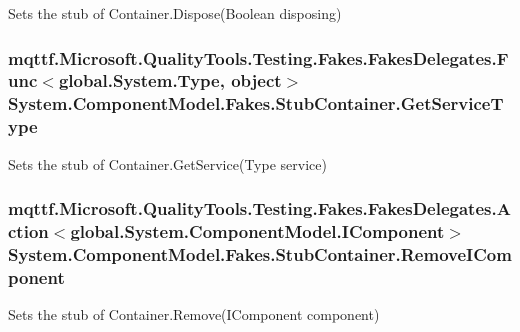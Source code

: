 Sets the stub of Container.\-Dispose(\-Boolean disposing)

\hypertarget{class_system_1_1_component_model_1_1_fakes_1_1_stub_container_a81580c55f5822c72b84cf20a802fa318}{
\subsubsection[{Get\-Service\-Type}]{\setlength{\rightskip}{0pt plus 5cm}mqttf.\-Microsoft.\-Quality\-Tools.\-Testing.\-Fakes.\-Fakes\-Delegates.\-Func$<$global.\-System.\-Type, object$>$ System.\-Component\-Model.\-Fakes.\-Stub\-Container.\-Get\-Service\-Type}}\label{class_system_1_1_component_model_1_1_fakes_1_1_stub_container_a81580c55f5822c72b84cf20a802fa318}


Sets the stub of Container.\-Get\-Service(\-Type service)

\hypertarget{class_system_1_1_component_model_1_1_fakes_1_1_stub_container_a0379ab10d6436a4136723460610443c2}{
\subsubsection[{Remove\-I\-Component}]{\setlength{\rightskip}{0pt plus 5cm}mqttf.\-Microsoft.\-Quality\-Tools.\-Testing.\-Fakes.\-Fakes\-Delegates.\-Action$<$global.\-System.\-Component\-Model.\-I\-Component$>$ System.\-Component\-Model.\-Fakes.\-Stub\-Container.\-Remove\-I\-Component}}\label{class_system_1_1_component_model_1_1_fakes_1_1_stub_container_a0379ab10d6436a4136723460610443c2}


Sets the stub of Container.\-Remove(\-I\-Component component)

